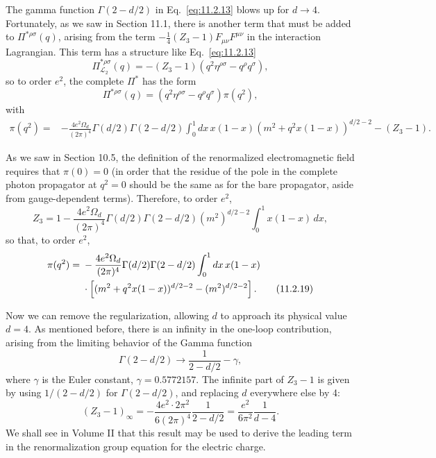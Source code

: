 The gamma function $\Gamma(2-d/2)$ in Eq.~\eqref{eq:11.2.13} blows up for
$d\to4$. Fortunately, as we saw in Section 11.1, there is another term that
must be added to $\Pi^{*\rho\sigma}(q)$, arising from the term
$-\tfrac14(Z_3-1)F_{\mu\nu}F^{\mu\nu}$ in the interaction Lagrangian.
This term has a structure like Eq.~\eqref{eq:11.2.13}
\begin{equation}
  \Pi_{\mathcal L_2}^{*\rho\sigma}(q)
  =-(Z_3-1)(q^2\eta^{\rho\sigma}-q^\rho q^\sigma),
  \tag{11.2.15}\label{eq:11.2.15}
\end{equation}
so to order $e^2$, the complete $\Pi^*$ has the form
\begin{equation}
  \Pi^{*\rho\sigma}(q)=(q^2\eta^{\rho\sigma}-q^\rho q^\sigma)\pi(q^2),
  \tag{11.2.16}\label{eq:11.2.16}
\end{equation}
with
\begin{align}
  \pi(q^2)={}&-\frac{4e^2\Omega_d}{(2\pi)^4}
  \Gamma(d/2)\Gamma(2-d/2)\int_0^1dx\,x(1-x)
  (m^2+q^2x(1-x))^{d/2-2}
  -(Z_3-1).
  \tag{11.2.17}\label{eq:11.2.17}
\end{align}

As we saw in Section 10.5, the definition of the renormalized
electromagnetic field requires that $\pi(0)=0$ (in order that the residue
of the pole in the complete photon propagator at $q^2=0$ should be the
same as for the bare propagator, aside from gauge-dependent terms).
Therefore, to order $e^2$,
\begin{equation}
  Z_3=1-\frac{4e^2\Omega_d}{(2\pi)^4}\Gamma(d/2)\Gamma(2-d/2)
  (m^2)^{d/2-2}\int_0^1x(1-x)\,dx,
  \tag{11.2.18}\label{eq:11.2.18}
\end{equation}
so that, to order $e^2$,
\begin{align}
  \pi(q^2)={}&-\frac{4e^2\Omega_d}{(2\pi)^4}
  \Gamma(d/2)\Gamma(2-d/2)\int_0^1dx\,x(1-x)\notag\\
  &\cdot\left[(m^2+q^2x(1-x))^{d/2-2}-(m^2)^{d/2-2}\right].
  \tag{11.2.19}\label{eq:11.2.19}
\end{align}

Now we can remove the regularization, allowing $d$ to approach its
physical value $d=4$. As mentioned before, there is an infinity in the
one-loop contribution, arising from the limiting behavior of the Gamma
function
\[
  \Gamma(2-d/2)\longrightarrow\frac1{2-d/2}-\gamma,
\]
where $\gamma$ is the Euler constant, $\gamma=0.5772157$. The infinite part
of $Z_3-1$ is given by using $1/(2-d/2)$ for $\Gamma(2-d/2)$, and
replacing $d$ everywhere else by 4:
\begin{equation}
  (Z_3-1)_\infty
  =-\frac{4e^2\cdot2\pi^2}{6(2\pi)^4}\frac1{2-d/2}
  =\frac{e^2}{6\pi^2}\frac1{d-4}.
  \tag{11.2.20}\label{eq:11.2.20}
\end{equation}
We shall see in Volume II that this result may be used to derive the leading
term in the renormalization group equation for the electric charge.

